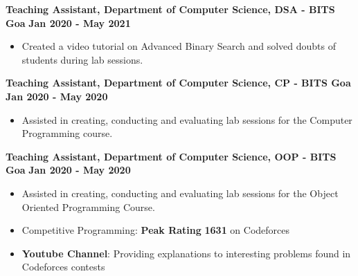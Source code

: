 \documentclass[10pt]{article}
\begin{document}
\spacedhrule{0.15ex}{1.0ex}
\large {\textbf{Teaching Assistant, Department of Computer Science, DSA - BITS Goa}} \normalsize \href{https://www.youtube.com/watch?v=bOHH3VrtWbI}{\hspace{0.5ex}\faMousePointer} {\hfill} \textbf{Jan 2020 - May 2021}\\[-1.75em]
\begin{itemize}
    \item Created a video tutorial on Advanced Binary Search and solved doubts of students during lab sessions.\\[-1em]
\end{itemize}
\large {\textbf{Teaching Assistant, Department of Computer Science, CP - BITS Goa}} \normalsize \href{https://github.com/vezcraz/Credentials/blob/master/Verification\%20Docs/cp\%20ta.pdf}{\hspace{0.5ex}\faMousePointer} {\hfill} \textbf{Jan 2020 - May 2020}\\[-1.75em]
\begin{itemize}
    
    \item Assisted in creating, conducting and evaluating lab sessions for the Computer Programming course.\\[-1.25em]
\end{itemize}
\large {\textbf{Teaching Assistant, Department of Computer Science, OOP - BITS Goa}} \normalsize \href{https://github.com/vezcraz/Credentials/blob/master/Verification\%20Docs/oop\%20ta.pdf}{\hspace{0.5ex}\faMousePointer} {\hfill} \textbf{Jan 2020 - May 2020}\\[-1.75em]
\begin{itemize}
    \item Assisted in creating, conducting and evaluating lab sessions for the Object Oriented Programming Course.\\[-1em]
\end{itemize}

\vspace{-3ex}
\spacedhrule{0.15ex}{1.0ex}
\begin{itemize}[leftmargin=*]
\item Competitive Programming: \textbf{Peak Rating} \textbf{1631} on Codeforces \href{https://codeforces.com/profile/vezcraz} {\hspace{0.5ex}\faMousePointer} \\[-1.8em]
\item \textbf{Youtube Channel}: Providing explanations to interesting problems found in Codeforces contests  \href{https://www.youtube.com/channel/UCyz1KIrbfCaQfCIzZXcdC8g} {\hspace{0.5ex}\faMousePointer} \\[-1.8em]
\end{itemize}
\end{document}
